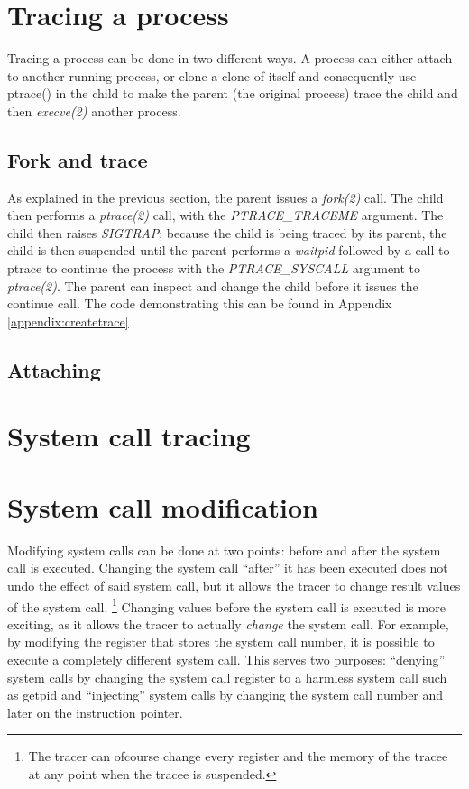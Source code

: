 \documentclass[a4paper, twoside, 10pt]{report}
\begin{document}
\section{Tracing a process}

Tracing a process can be done in two different ways. A process can either attach
to another running process, or clone a clone of itself and consequently  use
ptrace() in the child to make the parent (the original process) trace the child
and then \textit{execve(2)} another process.

\subsection{Fork and trace}

As explained in the previous section, the parent issues a \textit{fork(2)} call.
The child then performs a \textit{ptrace(2)} call, with the
\textit{PTRACE\_TRACEME} argument. The child then raises \textit{SIGTRAP};
because the child is being traced by its parent, the child is then suspended
until the parent performs a \textit{waitpid} followed by a call to ptrace to
continue the process with the \textit{PTRACE\_SYSCALL} argument to
\textit{ptrace(2)}. The parent can inspect and change the child before it issues
the continue call. The code demonstrating this can be found in
Appendix \ref{appendix:createtrace}

\subsection{Attaching}

\section{System call tracing}




\section{System call modification}


Modifying system calls can be done at two points: before and after the
system call is executed. Changing the system call ``after'' it has been executed
does not undo the effect of said system call, but it allows the tracer to change
result values of the system call.
\footnote{The tracer can ofcourse change every register and the memory of the
tracee at any point when the tracee is suspended.}
Changing values before the system call is executed is more exciting, as it
allows the tracer to actually \textit{change} the system call. For example, by
modifying the register that stores the system call number, it is possible to
execute a completely different system call. This serves two purposes:
``denying'' system calls by changing the system call register to a harmless
system call such as getpid and ``injecting'' system calls by changing the
system call number and later on the instruction pointer.
\end{document}
